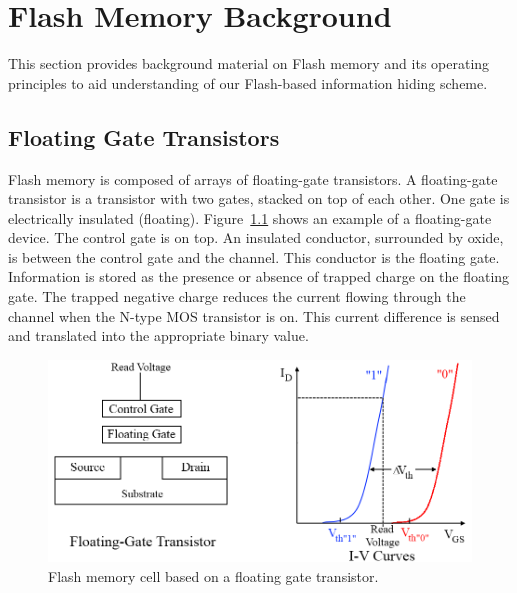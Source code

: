 \chapter{Flash Memory Background} \label{sec:flashbackground}

This section provides background material on Flash memory and
its operating principles to aid understanding of our Flash-based
information hiding scheme.

\section{Floating Gate Transistors}

Flash memory is composed of arrays of floating-gate transistors.
A floating-gate transistor is a transistor with two gates,
stacked on top of each other. One gate is electrically insulated
(floating). Figure~\ref{fig:fgtrans} shows an example of a floating-gate device.
The control gate is on top. An insulated conductor, surrounded
by oxide, is between the control gate and the channel. This
conductor is the floating gate. Information is stored as the
presence or absence of trapped charge on the floating gate. The
trapped negative charge reduces the current flowing through the
channel when the N-type MOS transistor is on. This current
difference is sensed and translated into the appropriate binary
value.


\begin{figure} 
\begin{center} 
\includegraphics[width=\mywidth]{figs/fgtrans-cleanaxis.png} 
\caption{Flash memory cell based on a floating gate transistor.}
\label{fig:fgtrans} 
\end{center} 
\end{figure} 

